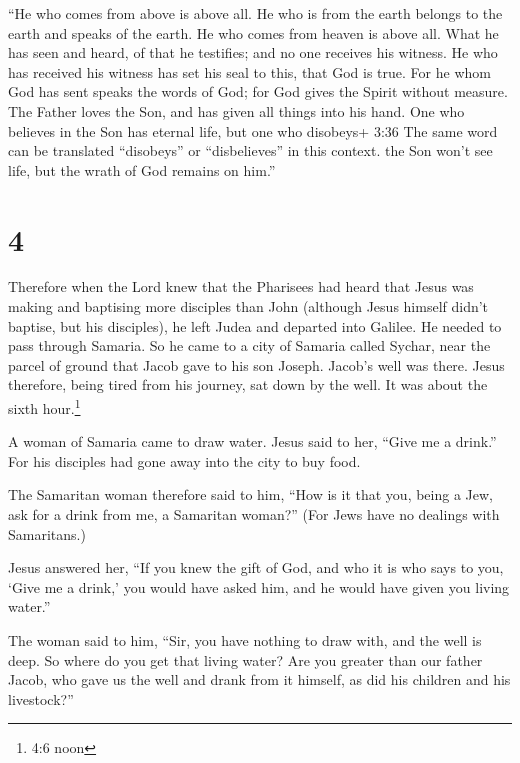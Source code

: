 ``He who comes from above is above all. He who is from the
earth belongs to the earth and speaks of the earth. He who comes from
heaven is above all.  What he has seen and heard, of that
he testifies; and no one receives his witness.  He who has
received his witness has set his seal to this, that God is true.
 For he whom God has sent speaks the words of God; for God
gives the Spirit without measure.  The Father loves the
Son, and has given all things into his hand.  One who
believes in the Son has eternal life, but one who disobeys+ 3:36 The
same word can be translated ``disobeys'' or ``disbelieves'' in this
context. the Son won't see life, but the wrath of God remains on him.''

\hypertarget{section-3}{%
\section{4}\label{section-3}}

 Therefore when the Lord knew that the Pharisees had heard
that Jesus was making and baptising more disciples than John
 (although Jesus himself didn't baptise, but his disciples),
 he left Judea and departed into Galilee.  He
needed to pass through Samaria.  So he came to a city of
Samaria called Sychar, near the parcel of ground that Jacob gave to his
son Joseph.  Jacob's well was there. Jesus therefore, being
tired from his journey, sat down by the well. It was about the sixth
hour.\footnote{4:6 noon}

 A woman of Samaria came to draw water. Jesus said to her,
``Give me a drink.''  For his disciples had gone away into
the city to buy food.

 The Samaritan woman therefore said to him, ``How is it that
you, being a Jew, ask for a drink from me, a Samaritan woman?'' (For
Jews have no dealings with Samaritans.)

 Jesus answered her, ``If you knew the gift of God, and who
it is who says to you, `Give me a drink,' you would have asked him, and
he would have given you living water.''

 The woman said to him, ``Sir, you have nothing to draw
with, and the well is deep. So where do you get that living water?
 Are you greater than our father Jacob, who gave us the
well and drank from it himself, as did his children and his livestock?''

